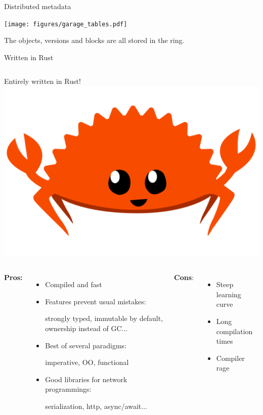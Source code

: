 \begin{frame}{Distributed metadata}

\centering
\texttt{[image: figures/garage\_tables.pdf]}
\vfill

The objects, versions and blocks are all stored in the ring.

\end{frame}


\begin{frame}{Written in Rust}

\begin{columns}
Entirely written in Rust!
\centering
\includegraphics[width=.85\columnwidth]{figures/rustacean-flat-happy.png}
\end{columns}
\vfill

\begin{columns}
	\textbf{Pros:}
	\begin{itemize}
		\item Compiled and fast
		\item Features prevent usual mistakes:

		strongly typed, immutable by default, ownership instead of GC...

		\item Best of several paradigms:

		imperative, OO, functional

		\item Good libraries for network programmings:

		serialization, http, async/await...
	\end{itemize}
	\textbf{Cons}:
	\begin{itemize}
		\item Steep learning curve
		\item Long compilation times
		\item Compiler rage
	\end{itemize}
\end{columns}

\end{frame}